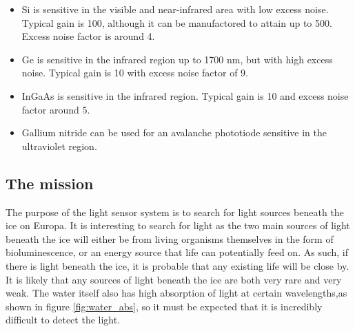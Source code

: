\begin{itemize}

\item Si is sensitive in the visible and near-infrared area with low excess noise. Typical gain is 100, although it can be manufactored to attain up to 500. Excess noise factor is around 4.
\\
\item Ge is sensitive in the infrared region up to 1700 nm, but with high excess noise. Typical gain is 10 with excess noise factor of 9.
\\
\item InGaAs is sensitive in the infrared region. Typical gain is 10 and excess noise factor around 5.
\\
\item Gallium nitride can be used for an avalanche phototiode sensitive in the ultraviolet region. 

\end{itemize}

\subsection{The mission}

The purpose of the light sensor system is to search for light sources beneath the ice on Europa. It is interesting to search for light as the two main sources of light beneath the ice will either be from living organisms themselves in the form of bioluminescence, or an energy source that life can potentially feed on. As such, if there is light beneath the ice, it is probable that any existing life will be close by. It is likely that any sources of light beneath the ice are both very rare and very weak. The water itself also has high absorption of light at certain wavelengths,as shown in figure \ref{fig:water_abs}, so it must be expected that it is incredibly difficult to detect the light.\\  

